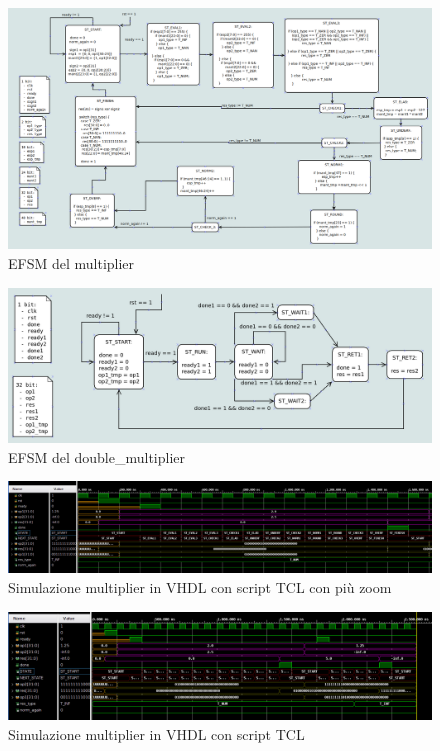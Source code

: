 \documentclass[]{IEEEtran}
\begin{document}
\begin{figure}[bt]
    \centering
    \includegraphics[width=\textwidth]{figures/EFSM_mult}
    \caption{EFSM del multiplier}
    \label{fig:EFSM_MULT}
\end{figure}

\begin{figure}[bt]
    \centering
    \includegraphics[width=\textwidth]{figures/EFSM_dm}
    \caption{EFSM del double\_multiplier}
    \label{fig:EFSM_DM}
\end{figure}

\begin{figure}[bt]
    \centering
    \includegraphics[width=\textwidth]{figures/sim_mult_vhdl_zoom}
    \caption{Simulazione multiplier in VHDL con script TCL con più zoom}
    \label{fig:SIM_MULT_VHDL_ZOOM}
\end{figure}

\begin{figure}[bt]
    \centering
    \includegraphics[width=\textwidth]{figures/sim_mult_vhdl}
    \caption{Simulazione multiplier in VHDL con script TCL}
    \label{fig:SIM_MULT_VHDL}
\end{figure}
\end{document}

